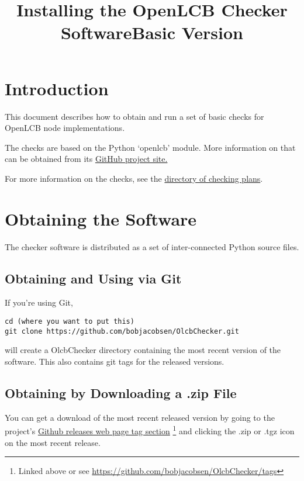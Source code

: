 

\title{Installing the OpenLCB Checker Software\linebreak{}Basic Version}


\maketitle

\section{Introduction}

This document describes how to obtain and run a set of basic checks for 
OpenLCB node implementations.  

The checks are based on the Python `openlcb' module.
More information on that can be obtained from its
\href{https://github.com/bobjacobsen/PythonOlcbNode}{GitHub project site.}

For more information on the checks, see the
\href{https://github.com/bobjacobsen/OlcbChecker/tree/main/plans/}{directory of checking plans}.

\section{Obtaining the Software}

The checker software is distributed as a set of inter-connected Python source files.

\subsection{Obtaining and Using via Git}

If you're using Git, 
\begin{verbatim}
cd (where you want to put this)
git clone https://github.com/bobjacobsen/OlcbChecker.git
\end{verbatim}
will create a OlcbChecker directory containing the most recent version of the software.
This also contains git tags for the released versions.

\subsection{Obtaining by Downloading a .zip File}

You can get a download of the most recent released version by going to the project's 
\href{https://github.com/bobjacobsen/OlcbChecker/tags}{Github releases web page tag section}
\footnote{Linked above or see \href{https://github.com/bobjacobsen/OlcbChecker/tags}{https://github.com/bobjacobsen/OlcbChecker/tags}}
and clicking the .zip or .tgz icon on the most recent release.


